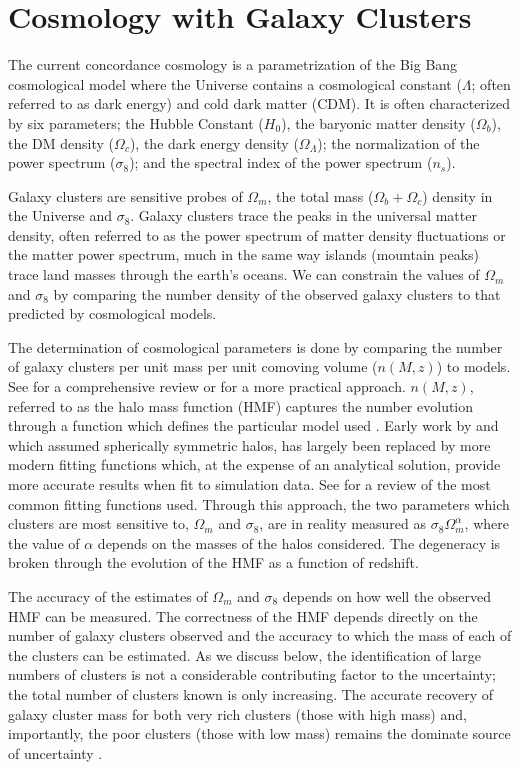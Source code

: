 \section{Cosmology with Galaxy Clusters}\label{sec: GC Cosmology}
The current concordance cosmology is a parametrization of the Big Bang cosmological model where the Universe contains a cosmological constant ($\Lambda$; often referred to as dark energy) and cold dark matter (CDM). It is often characterized by six parameters; the Hubble Constant ($H_0$), the baryonic matter density ($\Omega_b$), the DM density ($\Omega_c$), the dark energy density ($\Omega_\Lambda$); the normalization of the power spectrum ($\sigma_8$); and the spectral index of the power spectrum ($n_s$). 

Galaxy clusters are sensitive probes of $\Omega_m$, the total mass ($\Omega_b + \Omega_c$) density in the Universe and $\sigma_8$. Galaxy clusters trace the peaks in the universal matter density, often referred to as the power spectrum of matter density fluctuations or the matter power spectrum, much in the same way islands (mountain peaks) trace land masses through the earth's oceans. We can constrain the values of $\Omega_m$ and $\sigma_8$ by comparing the number density of the observed galaxy clusters to that predicted by cosmological models.

The determination of cosmological parameters is done by comparing the number of galaxy clusters per unit mass per unit comoving volume ($n(M,z)$) to models. See \cite{Allen2011} for a comprehensive review or \cite{Murray2013} for a more practical approach. $n(M,z)$, referred to as the halo mass function (HMF) captures the number evolution through a function which defines the particular model used . Early work by \cite{Press1974} and \cite{Bond1991} which assumed spherically symmetric halos, has largely been replaced by more modern fitting functions which, at the expense of an analytical solution, provide more accurate results when fit to simulation data. See \cite{Murray2013} for a review of the most common fitting functions used. Through this approach, the two parameters which clusters are most sensitive to, $\Omega_m$ and $\sigma_8$, are in reality measured as $\sigma_8\Omega_m^\alpha$, where the value of $\alpha$ depends on the masses of the halos considered. The degeneracy is broken through the evolution of the HMF as a function of redshift. 

The accuracy of the estimates of $\Omega_m$ and $\sigma_8$ depends on how well the observed HMF can be measured. The correctness of the HMF depends directly on the number of galaxy clusters observed and the accuracy to which the mass of each of the clusters can be estimated. As we discuss below, the identification of large numbers of clusters is not a considerable contributing factor to the uncertainty; the total number of clusters known is only increasing. The accurate recovery of galaxy cluster mass for both very rich clusters (those with high mass) and, importantly, the poor clusters (those with low mass) remains the dominate source of uncertainty .

